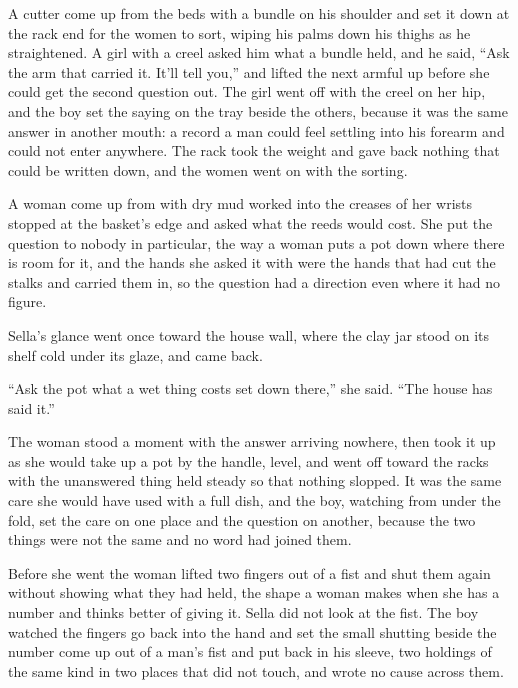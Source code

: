 A cutter come up from the beds with a bundle on his shoulder and set it down at the rack end for the women to sort, wiping his palms down his thighs as he straightened. A girl with a creel asked him what a bundle held, and he said, “Ask the arm that carried it. It'll tell you,” and lifted the next armful up before she could get the second question out. The girl went off with the creel on her hip, and the boy set the saying on the tray beside the others, because it was the same answer in another mouth: a record a man could feel settling into his forearm and could not enter anywhere. The rack took the weight and gave back nothing that could be written down, and the women went on with the sorting.

\scenebreak

A woman come up from  with dry mud worked into the creases of her wrists stopped at the basket's edge and asked what the reeds would cost. She put the question to nobody in particular, the way a woman puts a pot down where there is room for it, and the hands she asked it with were the hands that had cut the stalks and carried them in, so the question had a direction even where it had no figure.

Sella's glance went once toward the house wall, where the clay jar stood on its shelf cold under its glaze, and came back.

“Ask the pot what a wet thing costs set down there,” she said. “The house has said it.”

The woman stood a moment with the answer arriving nowhere, then took it up as she would take up a pot by the handle, level, and went off toward the racks with the unanswered thing held steady so that nothing slopped. It was the same care she would have used with a full dish, and the boy, watching from under the fold, set the care on one place and the question on another, because the two things were not the same and no word had joined them.

Before she went the woman lifted two fingers out of a fist and shut them again without showing what they had held, the shape a woman makes when she has a number and thinks better of giving it. Sella did not look at the fist. The boy watched the fingers go back into the hand and set the small shutting beside the number come up out of a man's fist and put back in his sleeve, two holdings of the same kind in two places that did not touch, and wrote no cause across them.

\scenebreak

